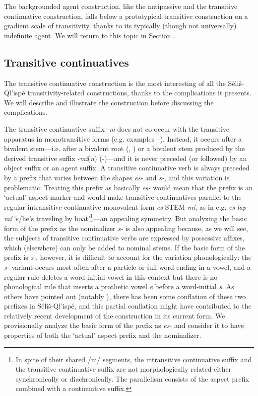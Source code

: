 \documentclass[output=paper,colorlinks,citecolor=brown]{langscibook}
\begin{document}
The backgrounded agent construction, like the antipassive and the
transitive continuative construction, falls below a prototypical
transitive construction on a gradient scale of transitivity, thanks to
its typically (though not universally) indefinite agent.  We will
return to this topic in Section .

\subsection{Transitive continuatives}  %
\label{thomason_section_2.6}

The transitive continuative construction is the most interesting of
all the S\'eli\v{s}-Ql'isp\'e transitivity-related constructions,
thanks to the complications it presents.  We will describe and
illustrate the construction before discussing the complications.

The transitive continuative suffix -\emph{m} does not co-occur with
the transitive apparatus in monotransitive forms (e.g.  examples --).
Instead, it occurs after a bivalent stem---i.e. after a bivalent root
(, ) or a bivalent stem produced by the derived transitive suffix
-\emph{m\'i}(\emph{n}) (-)---and it is never preceded (or
followed) by an object suffix or an agent suffix.  A transitive
continuative verb is always preceded by a prefix that varies between
the shapes \emph{es-} and \emph{s-}, and this variation is
problematic.  Treating this prefix as basically \emph{es-} would mean
that the prefix is an `actual' aspect marker and would make transitive
continuatives parallel to the regular intransitive continuative
monovalent form \emph{es}-STEM-\emph{m\'i}, as in
e.g. \emph{es-lap-m\'i} `s/he's traveling by boat'\footnote{In spite
of their shared /m/ segments, the intransitive continuative suffix and
the transitive continuative suffix are not morphologically related
either synchronically or diachronically. The parallelism consists of
the aspect prefix combined with a continuative suffix.  }---an
appealing symmetry.  But analyzing the basic form of the prefix as the
nominalizer \emph{s-} is also appealing because, as we will see, the
subjects of transitive continuative verbs are expressed by possessive
affixes, which (elsewhere) can only be added to nominal stems.  If the
basic form of the prefix is \emph{s-}, however, it is difficult to
account for the variation phonologically: the \emph{s-} variant occurs
most often after a particle or full word ending in a vowel, and a
regular rule deletes a word-initial vowel in this context but there
is no phonological rule that inserts a prothetic vowel \emph{e} before
a word-initial \emph{s}.  As others have pointed out (notably
\citet{Kroeber:1999}), there has been some conflation of these two
prefixes in S\'eli\v{s}-Ql'isp\'e, and this partial conflation might
have contributed to the relatively recent development of the
construction in its current form.  We provisionally analyze the basic
form of the prefix as \emph{es-} and consider it to have properties of
both the `actual' aspect prefix and the nominalizer.
\end{document}
